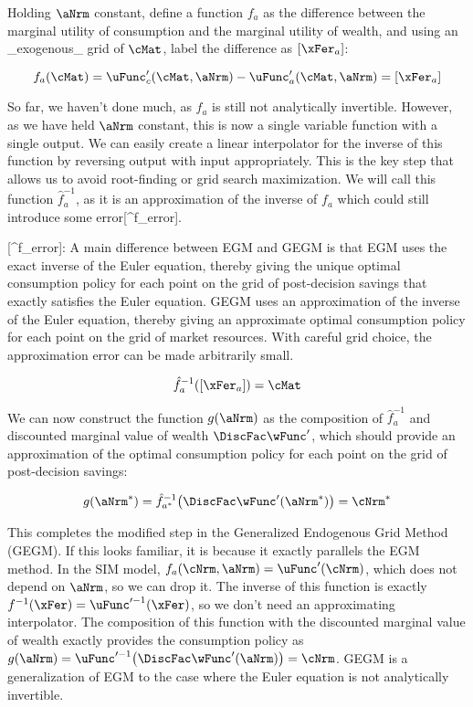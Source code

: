 Holding $\aNrm$ constant, define a function $f_{a}$ as the difference between the marginal utility of consumption and the marginal utility of wealth, and using an _exogenous_ grid of $\cMat$, label the difference as $[\xFer_{a}]$:

\begin{equation}
    f_{a}(\cMat) = \uFunc_{c}'(\cMat, \aNrm) - \uFunc_{a}'(\cMat, \aNrm) = [\xFer_{a}]
\end{equation}

So far, we haven't done much, as $f_a$ is still not analytically invertible. However, as we have held $\aNrm$ constant, this is now a single variable function with a single output. We can easily create a linear interpolator for the inverse of this function by reversing output with input appropriately. This is the key step that allows us to avoid root-finding or grid search maximization. We will call this function $\hat{f}_{a}^{-1}$, as it is an approximation of the inverse of $f_{a}$ which could still introduce some error[^f_error].

[^f_error]: A main difference between EGM and GEGM is that EGM uses the exact inverse of the Euler equation, thereby giving the unique optimal consumption policy for each point on the grid of post-decision savings that exactly satisfies the Euler equation. GEGM uses an approximation of the inverse of the Euler equation, thereby giving an approximate optimal consumption policy for each point on the grid of market resources. With careful grid choice, the approximation error can be made arbitrarily small.

\begin{equation}
    \hat{f}_{a}^{-1}([\xFer_{a}]) = \cMat
\end{equation}

We can now construct the function $g(\aNrm)$ as the composition of $\hat{f}_{a}^{-1}$ and discounted marginal value of wealth $\DiscFac \wFunc'$, which should provide an approximation of the optimal consumption policy for each point on the grid of post-decision savings:

\begin{equation}
    g(\aNrm^*) = \hat{f}_{a^*}^{-1} \big( \DiscFac \wFunc'(\aNrm^*) \big) = \cNrm^*
\end{equation}

This completes the modified step in the Generalized Endogenous Grid Method (GEGM). If this looks familiar, it is because it exactly parallels the EGM method. In the SIM model, $f_a(\cNrm,\aNrm) = \uFunc'(\cNrm)$, which does not depend on $\aNrm$, so we can drop it. The inverse of this function is exactly $f^{-1}(\xFer) = \uFunc'^{-1}(\xFer)$, so we don't need an approximating interpolator. The composition of this function with the discounted marginal value of wealth exactly provides the consumption policy as $g(\aNrm) = \uFunc'^{-1} \big( \DiscFac \wFunc'(\aNrm) \big) = \cNrm$. GEGM is a generalization of EGM to the case where the Euler equation is not analytically invertible.

